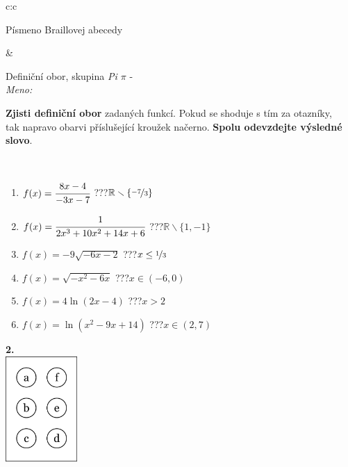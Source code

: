 \documentclass[10pt]{report}
\begin{document}
\begin{tabular}{c:c}
\begin{minipage}[c][104.5mm][t]{0.5\linewidth}
\begin{center}
\begin{minipage}{0.20\linewidth}
\begin{center}
{\small Písmeno Braillovej abecedy}
\end{center}
\end{minipage}
\end{center}
\end{minipage}
&
\begin{minipage}[c][104.5mm][t]{0.5\linewidth}
\begin{center}
\vspace{7mm}
{\huge Definiční obor, skupina \textit{Pi $\pi$} -}\\[5mm]
\textit{Meno:}\phantom{xxxxxxxxxxxxxxxxxxxxxxxxxxxxxxxxxxxxxxxxxxxxxxxxxxxxxxxxxxxxxxxxx}\\[5mm]
\begin{minipage}{0.95\linewidth}
\textbf{Zjisti definiční obor} zadaných funkcí. Pokud se shoduje s tím za otazníky,\\tak napravo obarvi příslušející kroužek načerno. \textbf{Spolu odevzdejte výsledné slovo}.
\end{minipage}
\\[1mm]
\begin{minipage}{0.79\linewidth}
\begin{center}
\begin{varwidth}{\linewidth}
\begin{enumerate}
\normalsizerrr
\item $f(x)=\cfrac{8x-4}{-3x-7}$\quad \dotfill\; ???\;\dotfill \quad $\mathbb{R}\smallsetminus\{\nicefrac{-7}{3}\}$
\item $f(x)=\cfrac{1}{2x^3+10x^2+14x+6}$\quad \dotfill\; ???\;\dotfill \quad $\mathbb{R}\smallsetminus\{1,-1\}$
\item $f(x)=-9\sqrt{-6x-2}$\quad \dotfill\; ???\;\dotfill \quad $x\leq\nicefrac{1}{3}$
\item $f(x)=\sqrt{-x^2-6x}$\quad \dotfill\; ???\;\dotfill \quad $x\in(-6 , 0)$
\item $f(x)=4\ln{(2x-4)}$\quad \dotfill\; ???\;\dotfill \quad $x>2$
\item $f(x)=\ln{(x^2-9x+14)}$\quad \dotfill\; ???\;\dotfill \quad $x\in(2 , 7)$
\end{enumerate}
\end{varwidth}
\end{center}
\end{minipage}
\begin{minipage}{0.20\linewidth}
\begin{center}
{\Huge\bfseries 2.} \\[2mm]
\includegraphics[height=40mm]{../images/braille.png}

\end{center}
\end{minipage}
\end{center}
\end{minipage}
\end{tabular}
\end{document}
